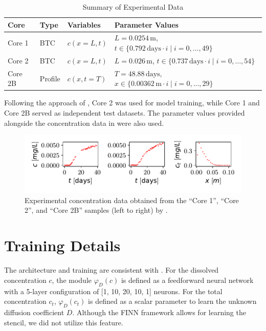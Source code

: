 \begin{table}[h!]
    \centering
    \caption{Summary of Experimental Data}
    \label{tab:experimental_data}
    \begin{tabular}{llll}
        \toprule
        Core   & Type       & Variables                 & Parameter Values                                      \\
        \midrule
        Core 1 & BTC        & $c(x=L, t)$              & $L = 0.0254\,\text{m}$, $t \in \{0.792\,\text{days} \cdot i \mid i = 0, \dots, 49\}$ \\
        Core 2 & BTC        & $c(x=L, t)$              & $L = 0.026\,\text{m}$, $t \in \{0.737\,\text{days} \cdot i \mid i = 0, \dots, 54\}$  \\
        Core 2B & Profile    & $c(x, t=T)$              & $T = 48.88\,\text{days}$, $x \in \{0.00362\,\text{m} \cdot i \mid i = 0, \dots, 29\}$ \\
        \bottomrule
    \end{tabular}
\end{table}

Following the approach of \citet{finn}, Core 2 was used for model training, while Core 1 and Core 2B served as independent test datasets. The parameter values provided alongside the concentration data in \citet{nowak2016entropy} were also used.


\begin{figure}[h]
    \centering
    \includegraphics{figs/core_data.pdf}
    \caption{Experimental concentration data obtained from the ``Core 1'', ``Core 2'', and ``Core 2B'' samples (left to right) by \citet{nowak2016entropy}.}
    \label{fig:core_data}
\end{figure}



\section{Training Details}
The architecture and training are consistent with \citet{finn}. For the dissolved concentration $c$, the module $\varphi_D(c)$ is defined as a feedforward neural network with a 5-layer configuration of [1, 10, 20, 10, 1] neurons. For the total concentration $c_t$, $\varphi_D(c_t)$ is defined as a scalar parameter to learn the unknown diffusion coefficient $D$. Although the FINN framework allows for learning the stencil, we did not utilize this feature.

